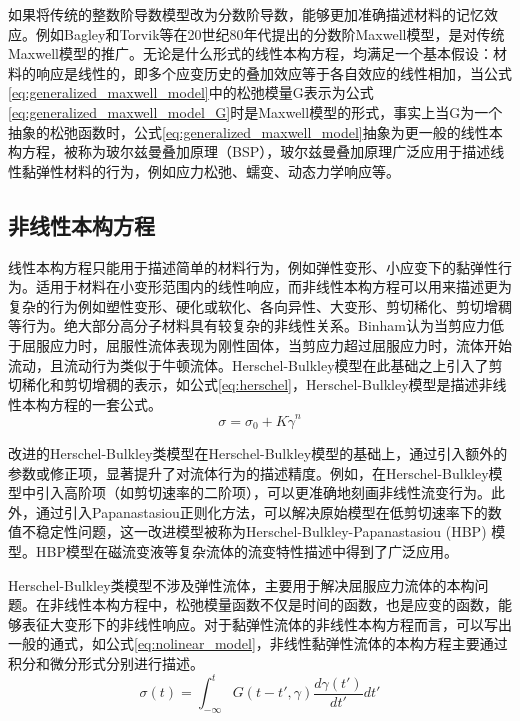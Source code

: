 如果将传统的整数阶导数模型改为分数阶导数，能够更加准确描述材料的记忆效应。例如Bagley和Torvik等在20世纪80年代提出的分数阶Maxwell模型，是对传统Maxwell模型的推广\cite{bagley1986fractional}。无论是什么形式的线性本构方程，均满足一个基本假设：材料的响应是线性的，即多个应变历史的叠加效应等于各自效应的线性相加，当公式\eqref{eq:generalized_maxwell_model}中的松弛模量G表示为公式\eqref{eq:generalized_maxwell_model_G}时是Maxwell模型的形式，事实上当G为一个抽象的松弛函数时，公式\eqref{eq:generalized_maxwell_model}抽象为更一般的线性本构方程，被称为玻尔兹曼叠加原理（BSP），玻尔兹曼叠加原理广泛应用于描述线性黏弹性材料的行为，例如应力松弛、蠕变、动态力学响应等\cite{boltzmannZurTheorieElastischen1878}。
\subsection{非线性本构方程}
线性本构方程只能用于描述简单的材料行为，例如弹性变形、小应变下的黏弹性行为\cite{fedorowiczElasticPerfectlyPlastic2024,lingComparisonReviewClassical2023,ricarteTutorialReviewLinear2024}。适用于材料在小变形范围内的线性响应，而非线性本构方程可以用来描述更为复杂的行为例如塑性变形、硬化或软化、各向异性、大变形、剪切稀化、剪切增稠等行为。绝大部分高分子材料具有较复杂的非线性关系。Binham认为当剪应力低于屈服应力时，屈服性流体表现为刚性固体，当剪应力超过屈服应力时，流体开始流动，且流动行为类似于牛顿流体\cite{binghaminvestigation}。Herschel-Bulkley模型在此基础之上引入了剪切稀化和剪切增稠的表示，如公式\eqref{eq:herschel}，Herschel-Bulkley模型是描述非线性本构方程的一套公式\cite{herschel1926konsistenzmessungen}。
\begin{equation}
  \sigma=\sigma_0+K\dot{\gamma}^n \label{eq:herschel}
\end{equation}

改进的Herschel-Bulkley类模型在Herschel-Bulkley模型的基础上，通过引入额外的参数或修正项，显著提升了对流体行为的描述精度。例如，在Herschel-Bulkley模型中引入高阶项（如剪切速率的二阶项），可以更准确地刻画非线性流变行为\cite{magnon2021precise}。此外，通过引入Papanastasiou正则化方法，可以解决原始模型在低剪切速率下的数值不稳定性问题，这一改进模型被称为Herschel-Bulkley-Papanastasiou (HBP) 模型。HBP模型在磁流变液等复杂流体的流变特性描述中得到了广泛应用\cite{papanastasiou1987flows}。

Herschel-Bulkley类模型不涉及弹性流体，主要用于解决屈服应力流体的本构问题。在非线性本构方程中，松弛模量函数不仅是时间的函数，也是应变的函数，能够表征大变形下的非线性响应。对于黏弹性流体的非线性本构方程而言，可以写出一般的通式，如公式\eqref{eq:nolinear_model}，非线性黏弹性流体的本构方程主要通过积分和微分形式分别进行描述\cite{ewoldtDesigningComplexFluids2022}。
\begin{equation}
  \sigma(t) = \int_{-\infty}^{t} G(t-t',\gamma) \frac{d\gamma(t')}{dt'} dt' \label{eq:nolinear_model}
\end{equation}

